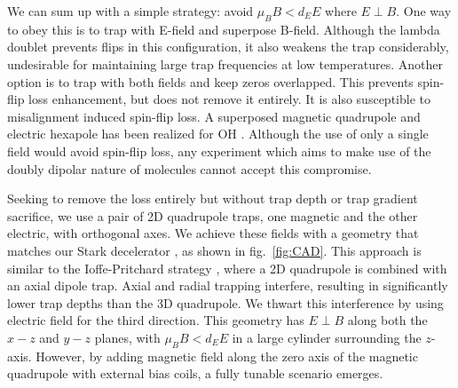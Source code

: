 \documentclass[%
 reprint,
 amsmath,amssymb,
 aps,
prl,
]{revtex4-1}
\begin{document}
We can sum up with a simple strategy: avoid $\mu_BB < d_EE$ where $E\!\perp\!B$. One way to obey this is to trap with E-field and superpose B-field. Although the lambda doublet prevents flips in this configuration, it also weakens the trap considerably, undesirable for maintaining large trap frequencies at low temperatures. Another option is to trap with both fields and keep zeros overlapped. This prevents spin-flip loss enhancement, but does not remove it entirely. It is also susceptible to misalignment induced spin-flip loss. A superposed magnetic quadrupole and electric hexapole has been realized for OH \cite{Sawyer2007}. Although the use of only a single field would avoid spin-flip loss, any experiment which aims to make use of the doubly dipolar nature of molecules cannot accept this compromise.

Seeking to remove the loss entirely but without trap depth or trap gradient sacrifice, we use a pair of 2D quadrupole traps, one magnetic and the other electric, with orthogonal axes. We achieve these fields with a geometry that matches our Stark decelerator \cite{Bochinski2003}, as shown in fig.~\ref{fig:CAD}. This approach is similar to the Ioffe-Pritchard strategy \cite{pritchard1983}, where a 2D quadrupole is combined with an axial dipole trap. Axial and radial trapping interfere, resulting in significantly lower trap depths than the 3D quadrupole. We thwart this interference by using electric field for the third direction. This geometry has $E\!\perp\! B$ along both the $x-z$ and $y-z$ planes, with $\mu_BB < d_EE$ in a large cylinder surrounding the $z$-axis. However, by adding magnetic field along the zero axis of the magnetic quadrupole with external bias coils, a fully tunable scenario emerges. %

\end{document}
